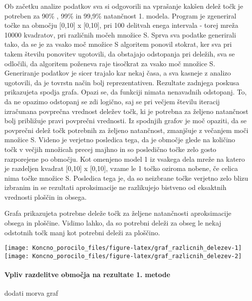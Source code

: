 \documentclass[
]{article}
\begin{document}
Ob začetku analize podatkov sva si odgovorili na vprašanje kakšen delež
točk je potreben za 90\% , 99\% in 99,9\% natančnost 1. modela. Program
je zgeneriral točke na območju {[}0,10{]} x {[}0,10{]}, pri 100 delitvah
enega intervala - torej mreža 10000 kvadratov, pri različnih močeh
množice S. Sprva sva podatke generirali tako, da se je za vsako moč
množice S algoritem ponovil stokrat, ker sva pri takem številu ponovitev
ugotovili, da obstajajo odstopanja pri deležih, sva se odločili, da
algoritem poženeva raje tisočkrat za vsako moč množice S. Generiranje
podatkov je sicer trajalo kar nekaj časa, a sva kasneje z analizo
ugotovili, da je tovrstn način bolj reprezentativen. Rezultate zadnjega
poskusa prikazujeta spodja grafa. Opazi se, da funkciji nimata
nenavadnih odstopanj. To, da ne opazimo odstopanj se zdi logično, saj se
pri večjem številu iteracij izračunana povprečna vrednost deležev točk,
ki je potrebna za željeno natančnost bolj približuje pravi povprečni
vrednosti. Iz spodnjih grafov je moč opaziti, da se povprečni delež točk
potrebnih za željeno natančnost, zmanjšuje z večanjem moči množice S.
Videno je verjetno posledica tega, da je območje glede na količino točk
v večjih množicah precej majhno in so posledično točke zelo gosto
razporejene po območju. Kot omenjeno model 1 iz vsakega dela mreže na
katero je razdeljen kvadrat {[}0,10{]} x {[}0,10{]}, vzame le 1 točko
oziroma nobene, če celica nima točke množice S. Posledica tega je, da so
neizbrane točke verjetno zelo blizu izbranim in se rezultati
aproksimacije ne razlikujejo bistveno od eksaktnih vrednosti ploščin in
obsega.

\newline Grafa prikazujeta potrebne deleže točk za željene natančnosti
aproksimacije obsega in ploščine. Vidimo lahko, da so potrebni deleži za
obseg le nekaj odstotnih točk manj kot potrebni deleži za ploščino.

\texttt{[image: Koncno\_porocilo\_files/figure-latex/graf\_razlicnih\_delezev-1]}
\texttt{[image: Koncno\_porocilo\_files/figure-latex/graf\_razlicnih\_delezev-2]}

\hypertarget{vpliv-razdelitve-obmoux10dja-na-rezultate-1.-metode}{%
\paragraph{Vpliv razdelitve območja na rezultate 1.
metode}\label{vpliv-razdelitve-obmoux10dja-na-rezultate-1.-metode}}

dodati morva graf
\end{document}
